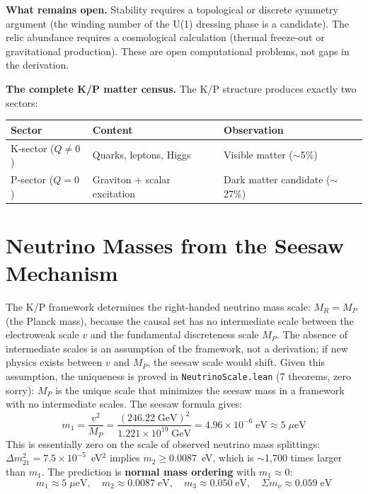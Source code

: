 \documentclass[11pt,letterpaper]{article}
\begin{document}
\medskip
\noindent\textbf{What remains open.}
Stability requires a topological or discrete
symmetry argument (the winding number of the U(1) dressing phase is a
candidate).  The relic abundance requires a cosmological calculation
(thermal freeze-out or gravitational production).  These are open
computational problems, not gaps in the derivation.

\medskip
\noindent\textbf{The complete K/P matter census.}
The K/P structure produces exactly two sectors:
\begin{center}
\begin{tabular}{@{}lll@{}}
\toprule
Sector & Content & Observation \\
\midrule
K-sector ($Q \neq 0$) & Quarks, leptons, Higgs &
  Visible matter ($\sim$5\%) \\
P-sector ($Q = 0$) & Graviton + scalar excitation &
  Dark matter candidate ($\sim$27\%) \\
\bottomrule
\end{tabular}
\end{center}

\section{Neutrino Masses from the Seesaw Mechanism}

The K/P framework determines the right-handed neutrino mass scale:
$M_R = M_P$ (the Planck mass), because the causal set has no
intermediate scale between the electroweak scale $v$ and the
fundamental discreteness scale $M_P$.  The absence of intermediate
scales is an assumption of the framework, not a derivation; if new
physics exists between $v$ and $M_P$, the seesaw scale would shift.
Given this assumption, the uniqueness is
proved in \texttt{NeutrinoScale.lean} (7 theorems, zero sorry):
$M_P$ is the unique scale that minimizes the seesaw mass in a
framework with no intermediate scales.  The seesaw formula gives:
\[
  m_1 = \frac{v^2}{M_P} = \frac{(246.22\;\mathrm{GeV})^2}
  {1.221 \times 10^{19}\;\mathrm{GeV}}
  = 4.96 \times 10^{-6}\;\mathrm{eV} \approx 5\;\mu\mathrm{eV}
\]
This is essentially zero on the scale of observed neutrino mass
splittings: $\Delta m^2_{21} = 7.5 \times 10^{-5}$~eV$^2$
implies $m_2 \geq 0.0087$~eV, which is $\sim$1{,}700 times larger
than $m_1$.  The prediction is \textbf{normal mass ordering}
with $m_1 \approx 0$:
\[
  m_1 \approx 5\;\mu\mathrm{eV}, \quad
  m_2 \approx 0.0087\;\mathrm{eV}, \quad
  m_3 \approx 0.050\;\mathrm{eV}, \quad
  \Sigma m_\nu \approx 0.059\;\mathrm{eV}
\]
\end{document}

